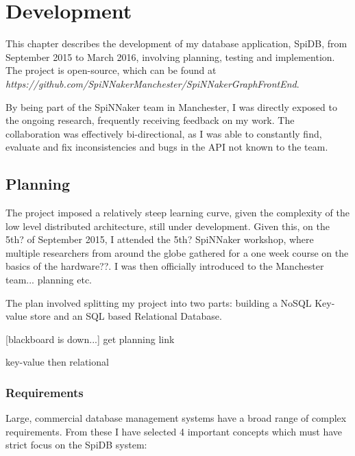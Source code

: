 \chapter{Development}

This chapter describes the development of my database application, SpiDB, from September 2015 to March 2016, involving planning, testing and implemention. The project is open-source, which can be found at
\textit{https://github.com/SpiNNakerManchester/SpiNNakerGraphFrontEnd}.

By being part of the SpiNNaker team in Manchester, I was directly exposed to the ongoing research, frequently receiving feedback on my work. The collaboration was effectively bi-directional, as I was able to constantly find, evaluate and fix inconsistencies and bugs in the API not known to the team.

\section{Planning}
The project imposed a relatively steep learning curve, given the complexity of the low level distributed architecture, still under development. Given this, on the 5th? of September 2015, I attended the 5th? SpiNNaker workshop, where multiple researchers from around the globe gathered for a one week course on the basics of the hardware??. I was then officially introduced to the Manchester team... planning etc.

The plan involved splitting my project into two parts: building a NoSQL Key-value store and an SQL based Relational Database.

[blackboard is down...] get planning link

key-value then relational

\subsection{Requirements}

Large, commercial database management systems have a broad range of complex requirements. From these I have selected 4 important concepts which must have strict focus on the SpiDB system:

